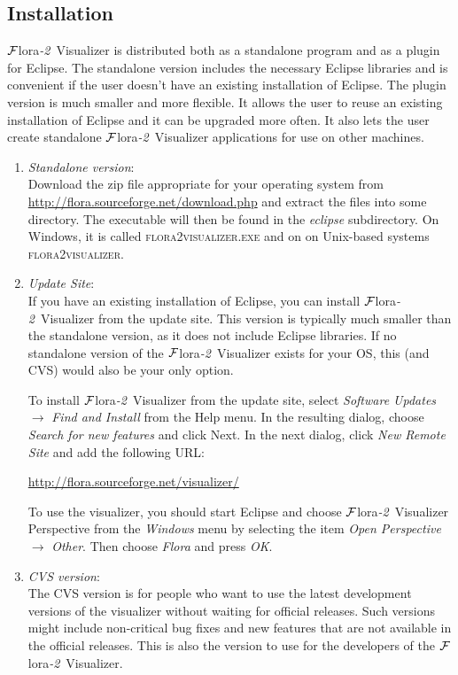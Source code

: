 \documentclass[a4paper,11pt]{article}
\newcommand{\FVIZ}{{\mbox{\sc ${\cal F}${lora}\rm\emph{-2} {Visualizer}}}\xspace}
\begin{document}
\subsection{Installation}
\label{sec:introduction_installation}

\FVIZ is distributed both as a standalone program
and as a plugin for Eclipse. The standalone version includes the necessary
Eclipse libraries and is convenient if the
user doesn't have an existing installation of Eclipse.
The plugin version is much smaller and more flexible. It allows the user
to reuse an existing installation of Eclipse and it can be upgraded more
often. It also lets the user create standalone \FVIZ applications for use
on other machines.

\begin{enumerate}
\item \emph{Standalone version}:\\
  Download the zip file appropriate for your operating system from
  \url{http://flora.sourceforge.net/download.php} and extract the files
  into some directory. The executable will then be found in the
  \emph{eclipse} subdirectory. 
  On Windows, it is called \textsc{flora2visualizer.exe} and on
  on Unix-based systems \textsc{flora2visualizer}.
\item \emph{Update Site}:\\
  If you have an existing installation of Eclipse, you can install \FVIZ
  from the update site.  This version is typically much smaller than the
  standalone version, as it does not include Eclipse libraries.
  If no standalone version of the \FVIZ exists for your
  OS, this (and CVS) would also be your only option.

  To install \FVIZ from the update site, select
  \emph{Software Updates} $\rightarrow$ \emph{Find and Install} from the
  {\rm Help} menu.  In the resulting dialog, choose \emph{Search for new features} and
  click Next.  In the next dialog, click \emph{New Remote Site} and add the
  following URL:

        \url{http://flora.sourceforge.net/visualizer/}

        To use the visualizer, you should start Eclipse and choose \FVIZ
        Perspective from the \emph{Windows} menu by selecting the item
        \emph{Open Perspective} $\rightarrow$ \emph{Other}. Then choose
        \emph{Flora} and press \emph{OK}.

\item \emph{CVS version}:\\
  The CVS version is for people who want to use the latest development
  versions of the visualizer without waiting for official releases.
  Such versions might include non-critical bug fixes and new features that
  are not available in the official releases. This is also the version to
  use for the developers of the \FVIZ.


\end{enumerate}
\end{document}
